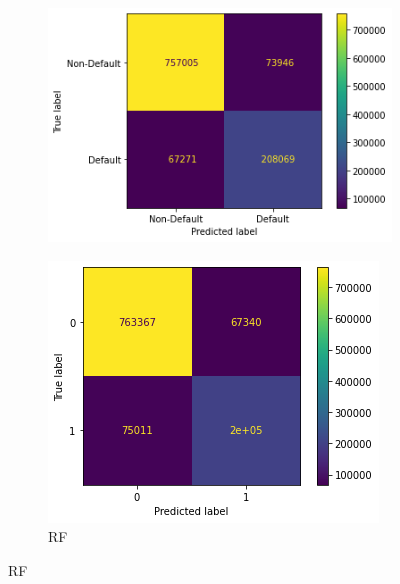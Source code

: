 \documentclass[twoside,11pt,a4paper]{article}
\begin{document}
\begin{figure}[h!]
	
	\begin{subfigure}{0.4 \textwidth}
		\includegraphics[width=1\linewidth, height=0.8\linewidth]{cm_svm}
		\label{fig:cm_svm}
	\end{subfigure}
	\hfill
	\begin{subfigure}{0.4 \textwidth}
		\includegraphics[width=1\linewidth, height=0.8\linewidth]{cm_rf}
		\caption[Random Forest]{\acs{RF}}
		\label{fig:cm_rf}
	\end{subfigure}

\end{figure}
\end{document}
